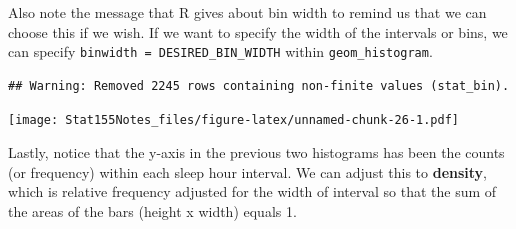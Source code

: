 \documentclass[]{book}
\newenvironment{Shaded}{\begin{snugshade}}{\end{snugshade}}
\newcommand{\DataTypeTok}[1]{\textcolor[rgb]{0.13,0.29,0.53}{#1}}
\newcommand{\DecValTok}[1]{\textcolor[rgb]{0.00,0.00,0.81}{#1}}
\newcommand{\FloatTok}[1]{\textcolor[rgb]{0.00,0.00,0.81}{#1}}
\newcommand{\KeywordTok}[1]{\textcolor[rgb]{0.13,0.29,0.53}{\textbf{#1}}}
\newcommand{\NormalTok}[1]{#1}
\newcommand{\OperatorTok}[1]{\textcolor[rgb]{0.81,0.36,0.00}{\textbf{#1}}}
\newcommand{\StringTok}[1]{\textcolor[rgb]{0.31,0.60,0.02}{#1}}
\begin{document}
Also note the message that R gives about bin width to remind us that we can choose this if we wish. If we want to specify the width of the intervals or bins, we can specify \texttt{binwidth\ =\ DESIRED\_BIN\_WIDTH} within \texttt{geom\_histogram}.

\begin{Shaded}
\end{Shaded}

\begin{verbatim}
## Warning: Removed 2245 rows containing non-finite values (stat_bin).
\end{verbatim}

\texttt{[image: Stat155Notes\_files/figure-latex/unnamed-chunk-26-1.pdf]}

Lastly, notice that the y-axis in the previous two histograms has been the counts (or frequency) within each sleep hour interval. We can adjust this to \textbf{density}, which is relative frequency adjusted for the width of interval so that the sum of the areas of the bars (height x width) equals 1.

\begin{Shaded}
\end{Shaded}
\end{document}
